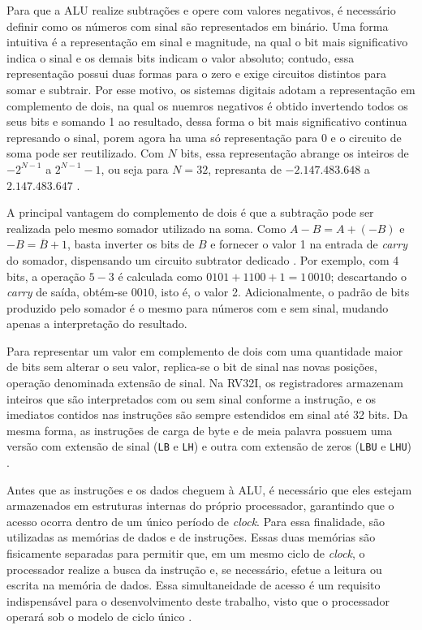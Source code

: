 Para que a ALU realize subtrações e opere com valores negativos, é necessário definir como os números com sinal são representados em binário. Uma forma intuitiva é a representação em sinal e magnitude, na qual o bit mais significativo indica o sinal e os demais bits indicam o valor absoluto; contudo, essa representação possui duas formas para o zero e exige circuitos distintos para somar e subtrair. Por esse motivo, os sistemas digitais adotam a representação em complemento de dois, na qual os nuemros negativos é obtido invertendo todos os seus bits e somando 1 ao resultado, dessa forma o bit mais significativo continua represando o sinal, porem agora ha uma só representação para 0 e o circuito de soma pode ser reutilizado. Com $N$ bits, essa representação abrange os inteiros de $-2^{N-1}$ a $2^{N-1}-1$, ou seja para $N = 32$, represanta de $-2.147.483.648$ a $2.147.483.647$  \cite{vahid2008sistemas}.

A principal vantagem do complemento de dois é que a subtração pode ser realizada pelo mesmo somador utilizado na soma. Como $A - B = A + (-B)$ e $-B = \overline{B} + 1$, basta inverter os bits de $B$ e fornecer o valor 1 na entrada de \textit{carry} do somador, dispensando um circuito subtrator dedicado \cite{vahid2008sistemas}. Por exemplo, com 4 bits, a operação $5 - 3$ é calculada como $0101 + 1100 + 1 = 1\,0010$; descartando o \textit{carry} de saída, obtém-se $0010$, isto é, o valor 2. Adicionalmente, o padrão de bits produzido pelo somador é o mesmo para números com e sem sinal, mudando apenas a interpretação do resultado.

Para representar um valor em complemento de dois com uma quantidade maior de bits sem alterar o seu valor, replica-se o bit de sinal nas novas posições, operação denominada extensão de sinal. Na RV32I, os registradores armazenam inteiros que são interpretados com ou sem sinal conforme a instrução, e os imediatos contidos nas instruções são sempre estendidos em sinal até 32 bits. Da mesma forma, as instruções de carga de byte e de meia palavra possuem uma versão com extensão de sinal (\texttt{LB} e \texttt{LH}) e outra com extensão de zeros (\texttt{LBU} e \texttt{LHU}) \cite{riscv_manual_2026}.

Antes que as instruções e os dados cheguem à ALU, é necessário que eles estejam armazenados em estruturas internas do próprio processador, garantindo que o acesso ocorra dentro de um único período de \textit{clock}. Para essa finalidade, são utilizadas as memórias de dados e de instruções. Essas duas memórias são fisicamente separadas para permitir que, em um mesmo ciclo de \textit{clock}, o processador realize a busca da instrução e, se necessário, efetue a leitura ou escrita na memória de dados. Essa simultaneidade de acesso é um requisito indispensável para o desenvolvimento deste trabalho, visto que o processador operará sob o modelo de ciclo único \cite{hennessy2017organizacao}.

